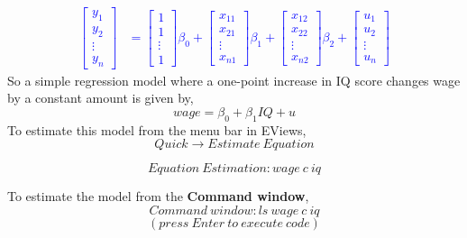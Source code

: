\documentclass[12pt]{report}
\newenvironment{blueframed}[1][blue]
{\def\FrameCommand{\fboxsep=\FrameSep\fcolorbox{#1}{white}}%
\MakeFramed {\advance\hsize-\width \FrameRestore}}
{\endMakeFramed}
\begin{document}
\begin{blueframed}
	\textcolor{blue}{\begin{align*}
		\begin{bmatrix}
		y_{1} \\
		y_{2} \\
		\vdots \\
		y_{n} 
		\end{bmatrix}
		&= 
		\begin{bmatrix}
		1 \\
		1 \\
		\vdots \\
		1   
		\end{bmatrix}
		\beta_0
		+
		\begin{bmatrix}
		x_{11} \\
		x_{21} \\
		\vdots \\
		x_{n1}   
		\end{bmatrix}
		\beta_1
		+
		\begin{bmatrix}
		x_{12} \\
		x_{22} \\
		\vdots \\
		x_{n2}   
		\end{bmatrix}
		\beta_2
		+
		\begin{bmatrix}
		u_{1} \\
		u_{2} \\
		\vdots \\
		u_{n} 
		\end{bmatrix}
		\end{align*}
	}
\end{blueframed}
\noindent So a simple regression model where a one-point increase in IQ score changes wage by a constant amount is given by,
$$wage=\beta_0+\beta_1IQ+u$$
\noindent To estimate this model from the menu bar in EViews,
$$Quick \to Estimate\ Equation$$
\begin{figure}[H]
	\centering
\end{figure}
\vspace{-\baselineskip}
$$Equation\ Estimation: wage\ c\ iq$$
\begin{figure}[H]
	\centering
\end{figure}
\vspace{-\baselineskip}
\noindent To estimate the model from the \textbf{Command window},
$$Command\ window: ls\ wage\ c\ iq$$
$$(press\ Enter\ to\ execute\ code)$$
\begin{figure}[H]
	\centering
\end{figure}
\end{document}
